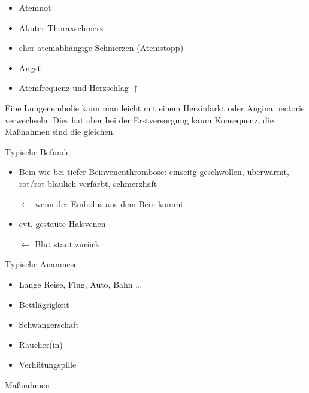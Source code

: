 \documentclass{article}
\begin{document}
\begin{itemize}
\item Atemnot

\item Akuter Thoraxschmerz

\end{itemize}
\begin{itemize}
\item eher atemabh\"angige Schmerzen (Atemstopp)

\end{itemize}
\begin{itemize}
\item Angst

\item Atemfrequenz und Herzschlag ${\uparrow}$

\end{itemize}
Eine Lungenembolie kann man leicht mit einem Herzinfarkt oder Angina
pectoris verwechseln. Dies hat aber bei der Erstversorgung kaum
Konsequenz, die Ma{\ss}nahmen sind die gleichen.

Typische Befunde

\begin{itemize}
\item Bein wie bei tiefer Beinvenenthrombose:  einseitg geschwollen,
\"uberw\"armt, rot/rot-bl\"aulich verf\"arbt, schmerzhaft

\begin{center}
\begin{minipage}{5.976cm}
${\leftarrow}$ wenn der Embolus aus dem Bein kommt

\end{minipage}
\end{center}
\item evt. gestaute Halsvenen

\begin{center}
\begin{minipage}{6.726cm}
${\leftarrow}$ Blut staut zur\"uck

\end{minipage}
\end{center}
\end{itemize}
Typische Anamnese

\begin{itemize}
\item Lange Reise, Flug, Auto, Bahn {\dots}

\item Bettl\"agrigkeit

\item Schwangerschaft

\item Raucher(in)

\item Verh\"utungspille

\end{itemize}
Ma{\ss}nahmen
\end{document}
